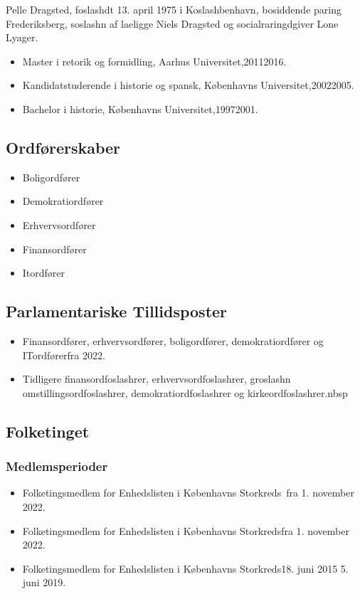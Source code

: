 \documentclass[11pt, a4paper]{awesome-cv}
\begin{document}
\makecvheader[R]
\makelettertitle
\begin{cvletter}
Pelle Dragsted, foslashdt 13. april 1975 i Koslashbenhavn, bosiddende paring Frederiksberg, soslashn af laeligge Niels Dragsted og socialraringdgiver Lone Lyager.

\begin{itemize}
\item Master i retorik og formidling, Aarhus Universitet,20112016.
\item Kandidatstuderende i historie og spansk, Københavns Universitet,20022005.
\item Bachelor i historie, Københavns Universitet,19972001.
\end{itemize}
\subsection*{Ordførerskaber}
\begin{itemize}
\item Boligordfører
\item Demokratiordfører
\item Erhvervsordfører
\item Finansordfører
\item Itordfører
\end{itemize}
\subsection*{Parlamentariske Tillidsposter}
\begin{itemize}
\item Finansordfører, erhvervsordfører, boligordfører, demokratiordfører og ITordførerfra 2022.
\item Tidligere finansordfoslashrer, erhvervsordfoslashrer, groslashn omstillingsordfoslashrer, demokratiordfoslashrer og kirkeordfoslashrer.nbsp
\end{itemize}
\subsection*{Folketinget}
\subsubsection*{Medlemsperioder}
\begin{itemize}
\item Folketingsmedlem for Enhedslisten i Københavns Storkreds fra 1. november 2022.
\item Folketingsmedlem for Enhedslisten i Københavns Storkredsfra 1. november 2022.
\item Folketingsmedlem for Enhedslisten i Københavns Storkreds18. juni 2015  5. juni 2019.
\end{itemize}

\end{cvletter}
\end{document}
